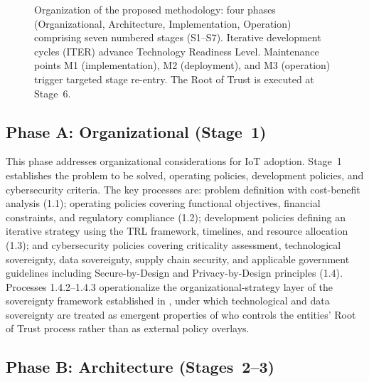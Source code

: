\documentclass[preprint,12pt,authoryear]{elsarticle}
\begin{document}
\begin{figure}[htbp]
    \centering
    
    \caption{Organization of the proposed methodology: four phases (Organizational, Architecture, Implementation, Operation) comprising seven numbered stages (S1--S7). Iterative development cycles (ITER) advance Technology Readiness Level. Maintenance points M1 (implementation), M2 (deployment), and M3 (operation) trigger targeted stage re-entry. The Root of Trust is executed at Stage~6.}
    \label{fig:metodologia}
\end{figure}

\subsection{Phase A: Organizational (Stage~1)}

This phase addresses organizational considerations for IoT adoption. Stage~1 establishes the problem to be solved, operating policies, development policies, and cybersecurity criteria. The key processes are: problem definition with cost-benefit analysis (1.1); operating policies covering functional objectives, financial constraints, and regulatory compliance (1.2); development policies defining an iterative strategy using the TRL framework, timelines, and resource allocation (1.3); and cybersecurity policies covering criticality assessment, technological sovereignty, data sovereignty, supply chain security, and applicable government guidelines including Secure-by-Design \citep{ukgov2024sbdprinciples} and Privacy-by-Design \citep{enisa2017baseline} principles (1.4). Processes 1.4.2--1.4.3 operationalize the organizational-strategy layer of the sovereignty framework established in \citet{campos2026identity}, under which technological and data sovereignty are treated as emergent properties of who controls the entities' Root of Trust process rather than as external policy overlays.

\subsection{Phase B: Architecture (Stages~2--3)}
\end{document}
